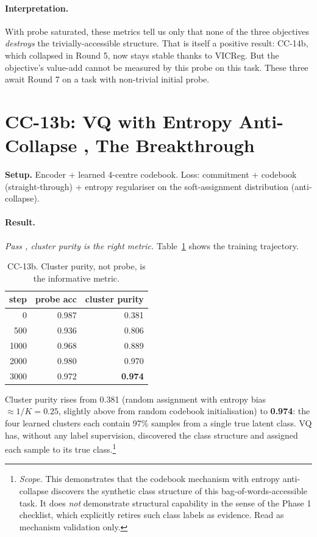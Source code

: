 \documentclass[10pt, twocolumn, a4paper]{article}
\begin{document}
\paragraph{Interpretation.} With probe saturated, these metrics tell us only that none of the three objectives \emph{destroys} the trivially-accessible structure. That is itself a positive result: CC-14b, which collapsed in Round 5, now stays stable thanks to VICReg. But the objective's value-add cannot be measured by this probe on this task. These three await Round 7 on a task with non-trivial initial probe.

\section{CC-13b: VQ with Entropy Anti-Collapse ,  The Breakthrough}

\textbf{Setup.} Encoder + learned 4-centre codebook. Loss: commitment + codebook (straight-through) + entropy regulariser on the soft-assignment distribution (anti-collapse).

\paragraph{Result.} \emph{Pass ,  cluster purity is the right metric.} Table~\ref{tab:cc13b} shows the training trajectory.

\begin{table}[t]
\centering\small
\caption{CC-13b. Cluster purity, not probe, is the informative metric.}
\label{tab:cc13b}
\begin{tabular}{rrr}
\toprule
step & probe acc & cluster purity \\
\midrule
0    & 0.987 & 0.381 \\
500  & 0.936 & 0.806 \\
1000 & 0.968 & 0.889 \\
2000 & 0.980 & 0.970 \\
3000 & 0.972 & \textbf{0.974} \\
\bottomrule
\end{tabular}
\end{table}

Cluster purity rises from 0.381 (random assignment with entropy bias $\approx 1/K = 0.25$, slightly above from random codebook initialisation) to \textbf{0.974}: the four learned clusters each contain 97\% samples from a single true latent class. VQ has, without any label supervision, discovered the class structure and assigned each sample to its true class.\footnote{\emph{Scope.} This demonstrates that the codebook mechanism with entropy anti-collapse discovers the synthetic class structure of this bag-of-words-accessible task. It does \emph{not} demonstrate structural capability in the sense of the Phase 1 checklist, which explicitly retires such class labels as evidence. Read as mechanism validation only.}
\end{document}

